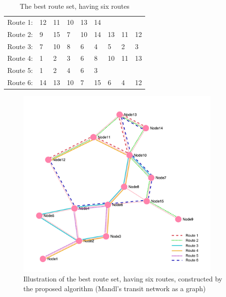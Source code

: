     \begin{table}[H]
    \centering
    \begin{tabular}{|l|l l l l l l l l|}
    \hline
    Route 1: & 12 & 11 & 10 & 13 & 14 &  &  &  \\
    Route 2: & 9 & 15 & 7 & 10 & 14 & 13 & 11 & 12 \\
    Route 3: & 7 & 10 & 8 & 6 & 4 & 5 & 2 & 3 \\
    Route 4: & 1 & 2 & 3 & 6 & 8 & 10 & 11 & 13 \\
    Route 5: & 1 & 2 & 4 & 6 & 3 &  &  &  \\
    Route 6: & 14 & 13 & 10 & 7 & 15 & 6 & 4 & 12 \\
    \hline
    \end{tabular}
    \caption {The best route set, having six routes}
    \label{table:performanceComparison_bestRouteSet6}
    \end{table}


    \begin{figure}[H]
    \begin{center}
    \includegraphics[width=4in]{assets/mandlnetwork_6routes.png}
    \end{center}
    \caption{Illustration of the best route set, having six routes, constructed by the proposed algorithm (Mandl's transit network as a graph)}
    \label{fig:bestRouteSet6} 
\end{figure}

